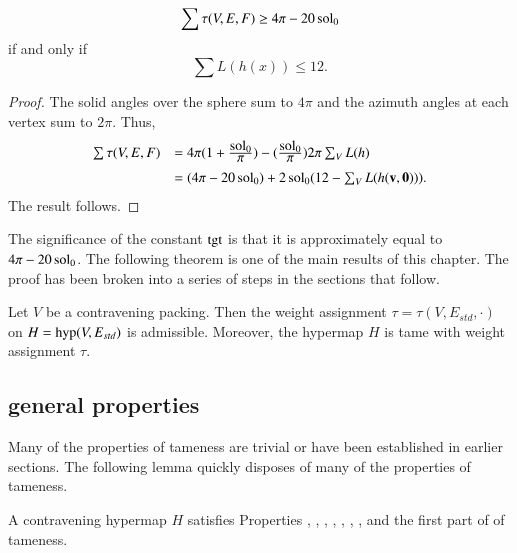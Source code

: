 \begin{lemma}
$$
\sum \tau (V,E,F) \ge 4\pi - 20\operatorname{sol}_0
$$
if and only if
$$
\sum L(h(x)) \le 12.
$$
\end{lemma}

\begin{proof}
The solid angles over the sphere sum to $4\pi$ and the azimuth angles at each vertex sum to $2\pi$. 
Thus,
\begin{equation}\label{eqn:delta0}
\begin{array}{lll}
\sum \tau (V,E,F) 
&= 4\pi (1 + \dfrac{\sol_0}{\pi}) - (\dfrac{\sol_0}{\pi}) 2\pi \sum_{V} L(h)\vspace{6pt}\\

&= (4\pi - 20\sol_0) + 2\sol_0 (12 - \sum_V L(h(\v,\orz))).
\end{array}
\end{equation}
The result follows.
\end{proof}

The significance of the constant ${\operatorname{tgt}}$ is that it is approximately equal to $4\pi - 20\operatorname{sol}_0$.
%
The following theorem is one of the main results of this chapter.  The proof has been broken into
a series of steps in the sections that follow.

\begin{theorem} \label{theorem:contravene}
Let $V$ be a contravening  packing.  Then the weight assignment $\tau=\tau(V,E_{std},\cdot)$ on
$H={\operatorname{hyp}}(V,E_{std})$ is admissible.  Moreover, 
the hypermap $H$ is tame with weight assignment $\tau$.
\end{theorem}
%
%
%



\subsection{general properties}
    \label{sec:startame}


Many of the properties of tameness are trivial or have been established in earlier sections.
The following lemma quickly disposes of many of the properties of tameness.

\begin{lemma}\label{lemma:multi} %
A contravening hypermap $H$ satisfies Properties
, , , , , , 
, and the first part of 
of tameness.
\end{lemma}

